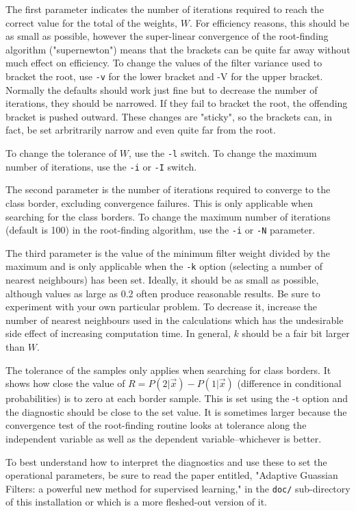 \documentclass[12pt]{article}
\begin{document}
  The first parameter indicates the number of iterations required to reach the correct value for the total of the weights, $W$.  For efficiency reasons, this should be as small as possible, however the super-linear convergence of the root-finding algorithm ("supernewton") means that the brackets can be quite far away without much effect on efficiency.  To change the values of the filter variance used to bracket the root, use \verb/-v/ for the lower bracket and -V for the upper bracket.  Normally the defaults should work just fine but to decrease the number of iterations, they should be narrowed.  If they fail to bracket the root, the offending bracket is pushed outward.  These changes are "sticky", so the brackets can, in fact, be set arbritrarily narrow and even quite far from the root.

  To change the tolerance of $W$, use the \verb/-l/ switch.  To change the maximum number of iterations, use the \verb/-i/ or \verb/-I/ switch.

  The second parameter is the number of iterations required to converge to the class border, excluding convergence failures.  This is only applicable when searching for the class borders.  To change the maximum number of iterations (default is 100) in the root-finding algorithm, use the \verb/-i/ or \verb/-N/ parameter.

  The third parameter is the value of the minimum filter weight divided by the maximum and is only applicable when the \verb/-k/ option (selecting a number of nearest neighbours) has been set.  Ideally, it should be as small as possible, although values as large as 0.2 often produce reasonable results.  Be sure to experiment with your own particular problem.  To decrease it, increase the number of nearest neighbours used in the calculations which has the undesirable side effect of increasing computation time.  In general, $k$ should be a fair bit larger than $W$.

  The tolerance of the samples only applies when searching for class borders.  It shows how close the value of $R=P(2|\vec x)-P(1|\vec x)$ (difference in conditional probabilities) is to zero at each border sample.  This is set using the -t option and the diagnostic should be close to the set value.  It is sometimes larger because the convergence test of the root-finding routine looks at tolerance along the independent variable as well as the dependent variable--whichever is better.

  To best understand how to interpret the diagnostics and use these to set the operational parameters, be sure to read the paper entitled, "Adaptive Guassian Filters: a powerful new method for supervised learning," in the \verb|doc/| sub-directory of this installation or \citet{Mills2011} which is a more fleshed-out version of it.
\end{document}

